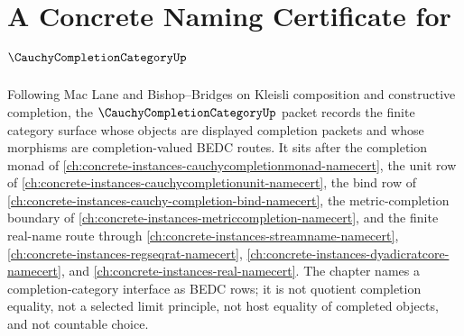 \chapter{A Concrete Naming Certificate for $\CauchyCompletionCategoryUp$}
\label{ch:concrete-instances-cauchy-completion-category-namecert}

Following Mac Lane and Bishop--Bridges on Kleisli composition and constructive completion, the $\CauchyCompletionCategoryUp$ packet records the finite category surface whose objects are displayed completion packets and whose morphisms are completion-valued BEDC routes. It sits after the completion monad of \autoref{ch:concrete-instances-cauchycompletionmonad-namecert}, the unit row of \autoref{ch:concrete-instances-cauchycompletionunit-namecert}, the bind row of \autoref{ch:concrete-instances-cauchy-completion-bind-namecert}, the metric-completion boundary of \autoref{ch:concrete-instances-metriccompletion-namecert}, and the finite real-name route through \autoref{ch:concrete-instances-streamname-namecert}, \autoref{ch:concrete-instances-regseqrat-namecert}, \autoref{ch:concrete-instances-dyadicratcore-namecert}, and \autoref{ch:concrete-instances-real-namecert}. The chapter names a completion-category interface as BEDC rows; it is not quotient completion equality, not a selected limit principle, not host equality of completed objects, and not countable choice.

